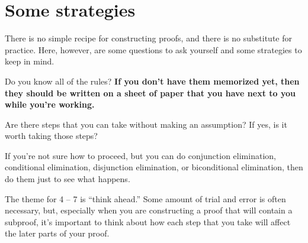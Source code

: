 


\chapter{Some strategies}
There is no simple recipe for constructing proofs, and there is no substitute for practice. Here, however, are some questions to ask yourself and some strategies to keep in mind.

\begin{earg}
\item[\ex{18-1}] Do you know all of the rules? \textbf{If you don’t have them memorized yet, then they should be written on a sheet of paper that you have next to you while you’re working.}
\medskip

\item[\ex{18-2}] Are there steps that you can take without making an assumption? If yes, is it worth taking those steps?
\medskip

\item[\ex{18-3}] If you’re not sure how to proceed, but you can do conjunction elimination, conditional elimination, disjunction elimination, or biconditional elimination, then do them just to see what happens.
\end{earg}

\noindent The theme for 4 -- 7 is ``think ahead.'' Some amount of trial and error is often necessary, but, especially when you are constructing a proof that will contain a subproof, it's important to think about how each step that you take will affect the later parts of your proof.

